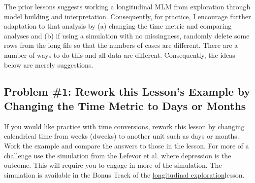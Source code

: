 \documentclass[
  11pt,
]{book}
\begin{document}
The prior lessons suggests working a longitudinal MLM from exploration through model building and interpretation. Consequently, for practice, I encourage further adaptation to that analysis by (a) changing the time metric and comparing analyses and (b) if using a simulation with no missingness, randomly delete some rows from the long file so that the numbers of cases are different. There are a number of ways to do this and all data are different. Consequently, the ideas below are merely suggestions.

\hypertarget{problem-1-rework-this-lessons-example-by-changing-the-time-metric-to-days-or-months}{%
\subsection{Problem \#1: Rework this Lesson's Example by Changing the Time Metric to Days or Months}\label{problem-1-rework-this-lessons-example-by-changing-the-time-metric-to-days-or-months}}

If you would like practice with time conversions, rework this lesson by changing calendrical time from weeks (dweeks) to another unit such as days or months. Work the example and compare the answers to those in the lesson. For more of a challenge use the simulation from the Lefevor et al. \citeyearpar{lefevor_religious_2017} where depression is the outcome. This will require you to engage in more of the simulation. The simulation is available in the Bonus Track of the \href{MLMexplore}{longitudinal exploration}lesson.
\end{document}
